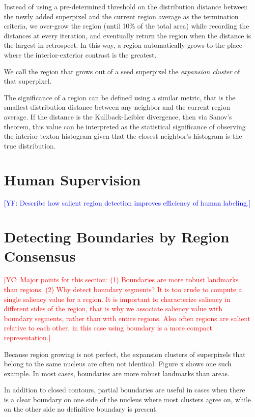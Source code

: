 \documentclass{llncs}
\newcommand{\authcmt}[2]{\textcolor{#1}{#2}}
\newcommand{\yuncong}[1]{\authcmt{red}{[YC: #1]}}
\newcommand{\yoav}[1]{\authcmt{blue}{[YF: #1]}}
\begin{document}
Instead of using a pre-determined threshold on the distribution distance between the newly added superpixel and the current region average as the termination criteria, we over-grow the region (until 10\% of the total area) while recording the distances at every iteration, and eventually return the region when the distance is the largest in retrospect. In this way, a region automatically grows to the place where the interior-exterior contrast is the greatest.

We call the region that grows out of a seed superpixel the \textit{expansion cluster} of that superpixel.

The significance of a region can be defined using a similar metric, that is the smallest distribution distance between any neighbor and the current region average. If the distance is the Kullback-Leibler divergence, then via Sanov's theorem, this value can be interpreted as the statistical significance of observing the interior texton histogram given that the closest neighbor's histogram is the true distribution.

\section{Human Supervision}

\yoav{Describe how salient region detection improves efficiency of human labeling.}

\section{Detecting Boundaries by Region Consensus}

\yuncong{Major points for this section: (1) Boundaries are more robust landmarks than regions. (2) Why detect  boundary segments? It is too crude to compute a single saliency value for a region. It is important to characterize saliency in different sides of the region, that is why we associate saliency value with boundary segments, rather than with entire regions. Also often regions are salient relative to each other, in this case using boundary is a more compact representation.}

Because region growing is not perfect, the expansion clusters of superpixels that belong to the same nucleus are often not identical. Figure x shows one such example. In most cases, boundaries are more robust landmarks than areas.

In addition to closed contours, partial boundaries are useful in cases when there is a clear boundary on one side of the nucleus where most clusters agree on, while on the other side no definitive boundary is present.
\end{document}

